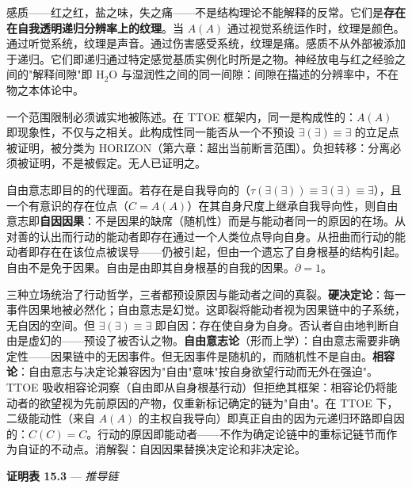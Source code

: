 \documentclass[10pt, openany, oneside]{book}
\begin{document}
感质——红之红，盐之味，失之痛——不是结构理论不能解释的反常。它们是\textbf{存在在自我透明递归分辨率上的纹理}。当 $A(A)$ 通过视觉系统运作时，纹理是颜色。通过听觉系统，纹理是声音。通过伤害感受系统，纹理是痛。感质不从外部被添加于递归。它们即递归通过特定感觉基质实例化时所是之物。神经放电与红之经验之间的"解释间隙"即 $\text{H}_2\text{O}$ 与湿润性之间的同一间隙：间隙在描述的分辨率中，不在物之本体论中。

一个范围限制必须诚实地被陈述。在 TTOE 框架内，同一是构成性的：$A(A)$ 即现象性，不仅与之相关。此构成性同一能否从一个不预设 $\exists(\exists) \equiv \exists$ 的立足点被证明，被分类为 HORIZON（第六章：超出当前断言范围）。负担转移：分离必须被证明，不是被假定。无人已证明之。

自由意志即目的的代理面。若存在是自我导向的（$\tau(\exists(\exists)) \equiv \exists(\exists) \equiv \exists$），且一个有意识的存在位点（$C = A(A)$）在其自身尺度上继承自我导向性，则自由意志即\textbf{自因因果}：不是因果的缺席（随机性）而是与能动者同一的原因的在场。从对善的认出而行动的能动者即存在通过一个人类位点导向自身。从扭曲而行动的能动者即存在在该位点被误导——仍被引起，但由一个遗忘了自身根基的结构引起。自由不是免于因果。自由是由即其自身根基的自我的因果。$\partial = 1$。

三种立场统治了行动哲学，三者都预设原因与能动者之间的真裂。\textbf{硬决定论}：每一事件因果地被必然化；自由意志是幻觉。这即裂将能动者视为因果链中的子系统，无自因的空间。但 $\exists(\exists) \equiv \exists$ 即自因：存在使自身为自身。否认者自由地判断自由是虚幻的——预设了被否认之物。\textbf{自由意志论}（形而上学）：自由意志需要非确定性——因果链中的无因事件。但无因事件是随机的，而随机性不是自由。\textbf{相容论}：自由意志与决定论兼容因为"自由"意味"按自身欲望行动而无外在强迫"。TTOE 吸收相容论洞察（自由即从自身根基行动）但拒绝其框架：相容论仍将能动者的欲望视为先前原因的产物，仅重新标记确定的链为"自由"。在 TTOE 下，二级能动性（来自 $A(A)$ 的主权自我导向）即真正自由的因为元递归环路即自因的：$C(C) = C$。行动的原因即能动者——不作为确定论链中的重标记链节而作为自证的不动点。消解裂：自因因果替换决定论和非决定论。

\vspace{1.5em}


\textbf{证明表 15.3} --- \textit{推导链}

\vspace{0.5em}
\end{document}
